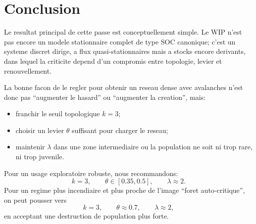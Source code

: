 \documentclass[11pt,a4paper]{article}
\begin{document}
\section{Conclusion}
Le resultat principal de cette passe est conceptuellement simple. Le WIP n'est pas encore un modele stationnaire complet de type SOC canonique; c'est un systeme discret dirige, a flux quasi-stationnaires mais a stocks encore derivants, dans lequel la criticite depend d'un compromis entre topologie, levier et renouvellement.

La bonne facon de le regler pour obtenir un reseau dense avec avalanches n'est donc pas ``augmenter le hasard'' ou ``augmenter la creation'', mais:
\begin{itemize}
\item franchir le seuil topologique $k=3$;
\item choisir un levier $\theta$ suffisant pour charger le reseau;
\item maintenir $\lambda$ dans une zone intermediaire ou la population ne soit ni trop rare, ni trop juvenile.
\end{itemize}

Pour un usage exploratoire robuste, nous recommandons:
\[
k=3,\qquad \theta \in [0.35,0.5],\qquad \lambda \approx 2.
\]
Pour un regime plus incendiaire et plus proche de l'image ``foret auto-critique'', on peut pousser vers
\[
k=3,\qquad \theta \approx 0.7,\qquad \lambda \approx 2,
\]
en acceptant une destruction de population plus forte.
\end{document}
